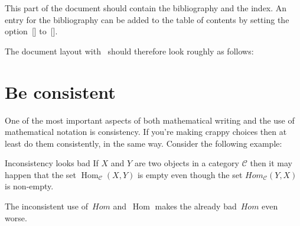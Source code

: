 \begin{itemize}
    This part of the document should contain the bibliography and the index.
    An entry for the bibliography can be added to the table of contents by setting the option~[\optname] to~[\optname].
\end{itemize}

The document layout with~ should therefore look roughly as follows:






\section{Be consistent}

One of the most important aspects of both mathematical writing and the use of mathematical notation is consistency.
If you’re making crappy choices then at least do them consistently, in the same way.
Consider the following example:
% 
% 
\begin{showlatex}{Inconsistency looks bad}
If $X$ and $Y$ are two objects in a category $$ then it may happen that the set $_{\mathcal{C}}(X,Y)$ is empty even though the set $Hom_{\mathcal{C}}(Y,X)$ is non-empty.
\end{showlatex}
The inconsistent use of~$Hom$ and~$$ makes the already bad~$Hom$ even worse.




